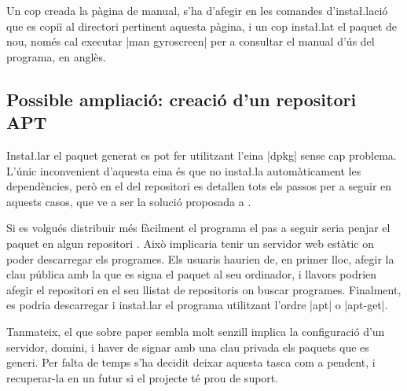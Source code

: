 Un cop creada la pàgina de manual, s'ha d'afegir en les comandes d'insta\l.lació
que es copiï al directori pertinent aquesta pàgina, i un cop insta\l.lat el
paquet de nou, només cal executar \ord|man gyroscreen| per a consultar el
manual d'ús del programa, en anglès.

\subsection{Possible ampliació: creació d'un repositori APT}

Insta\l.lar el paquet generat es pot fer utilitzant l'eina \ord|dpkg| sense cap
problema. L'únic inconvenient d'aquesta eina és que no insta\l.la automàticament
les dependències, però en el  del repositori es detallen tots els
passos per a seguir en aquests casos, que ve a ser la solució proposada a
\cite{dpkgHelp}.

Si es volgués distribuir més fàcilment el programa el pas a seguir seria
penjar el paquet en algun repositori . Això implicaria tenir un servidor
web estàtic on poder descarregar els programes. Els usuaris haurien de, en primer
lloc, afegir la clau pública amb la que es signa el paquet al seu ordinador, i
llavors podrien afegir el repositori  en el seu llistat de repositoris
on buscar programes. Finalment, es podria descarregar i insta\l.lar el programa
utilitzant l'ordre \ord|apt| o \ord|apt-get|.

Tanmateix, el que sobre paper sembla molt senzill implica la configuració d'un
servidor, domini, i haver de signar amb una clau privada els paquets que es
generi. Per falta de temps s'ha decidit deixar aquesta tasca com a pendent, i
recuperar-la en un futur si el projecte té prou de suport.
